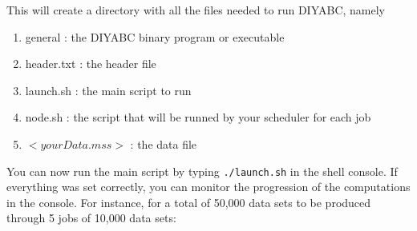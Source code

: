 This will create a directory with all the files needed to run DIYABC,
namely
\begin{enumerate}
\item \textsf{general} : the DIYABC binary program or executable
\item \textsf{header.txt} : the header file
\item \textsf{launch.sh} : the main script to run
\item \textsf{node.sh} : the script that will be runned by your scheduler
for each job
\item \textsf{$<yourData.mss>$} : the data file
\end{enumerate}
You can now run the main script by typing \texttt{./launch.sh} in
the shell console. If everything was set correctly, you can monitor
the progression of the computations in the console. For instance,
for a total of 50,000 data sets to be produced through 5 jobs of 10,000
data sets:\\
